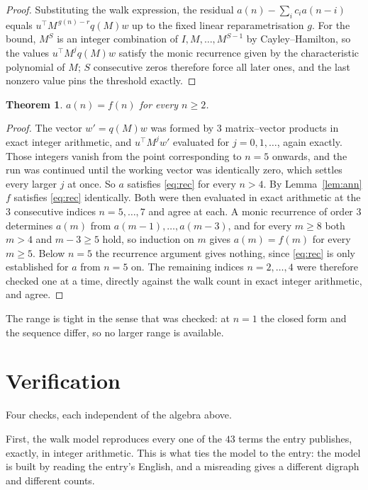 \documentclass[11pt,a4paper]{article}
\theoremstyle{plain}
\newtheorem{theorem}{Theorem}
\theoremstyle{definition}
\begin{document}
\begin{proof}
Substituting the walk expression, the residual $a(n)-\sum_ic_ia(n-i)$ equals
$u^{\!\top}M^{\,g(n)-r}q(M)w$ up to the fixed linear reparametrisation $g$. For the bound,
$M^{S}$ is an integer combination of $I,M,\dots,M^{S-1}$ by Cayley--Hamilton, so the values
$u^{\!\top}M^{j}q(M)w$ satisfy the monic recurrence given by the characteristic polynomial of
$M$; $S$ consecutive zeros therefore force all later ones, and the last nonzero value pins the
threshold exactly.
\end{proof}

\begin{theorem}
$a(n)=f(n)$ for every $n\ge2$.
\end{theorem}

\begin{proof}
The vector $w'=q(M)w$ was formed by $3$ matrix--vector products in exact integer
arithmetic, and $u^{\!\top}M^{j}w'$ evaluated for $j=0,1,\dots$, again exactly. Those integers
vanish from the point corresponding to $n=5$ onwards, and the run was continued until the
working vector was identically zero, which settles every larger $j$ at once. So $a$ satisfies
\eqref{eq:rec} for every $n>4$. By Lemma~\ref{lem:ann} $f$ satisfies \eqref{eq:rec}
identically. Both were then evaluated in exact arithmetic at the $3$ consecutive indices
$n=5,\dots,7$ and agree at each. A monic recurrence of order $3$
determines $a(m)$ from $a(m-1),\dots,a(m-3)$, and for every $m\ge8$ both
$m>4$ and $m-3\ge5$ hold, so induction on $m$ gives $a(m)=f(m)$ for every
$m\ge5$.
Below $n=5$ the recurrence argument gives nothing, since \eqref{eq:rec} is only
established for $a$ from $n=5$ on. The remaining indices $n=2,\dots,4$ were
therefore checked one at a time, directly against the walk count in exact integer arithmetic,
and agree.
\end{proof}

The range is tight in the sense that was checked: at $n=1$ the closed form and the sequence differ, so no larger range is available.

\section{Verification}

Four checks, each independent of the algebra above.

First, the walk model reproduces every one of the $43$ terms the entry publishes,
exactly, in integer arithmetic. This is what ties the model to the entry: the model is built
by reading the entry's English, and a misreading gives a different digraph and different
counts.
\end{document}
